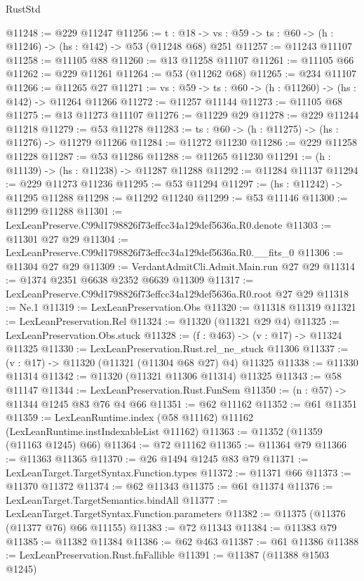 \begin{lexlean}{RustStd}
\begin{coremodule}
@11248 := @229 @11247
@11256 := {t : @18} ->
  {vs : @59} -> {ts : @60} -> (h : @11246) -> (hs : @142) -> @53 (@11248 @68) @251
@11257 := @11243 @11107
@11258 := @11105 @88
@11260 := @13 @11258 @11107
@11261 := @11105 @66
@11262 := @229 @11261
@11264 := @53 (@11262 @68)
@11265 := @234 @11107
@11266 := @11265 @27
@11271 := {vs : @59} -> {ts : @60} -> (h : @11260) -> (hs : @142) -> @11264 @11266
@11272 := @11257 @11144
@11273 := @11105 @68
@11275 := @13 @11273 @11107
@11276 := @11229 @29
@11278 := @229 @11244 @11218
@11279 := @53 @11278
@11283 := {ts : @60} -> (h : @11275) -> (hs : @11276) -> @11279 @11266
@11284 := @11272 @11230
@11286 := @229 @11258 @11228
@11287 := @53 @11286
@11288 := @11265 @11230
@11291 := (h : @11139) -> (hs : @11238) -> @11287 @11288
@11292 := @11284 @11137
@11294 := @229 @11273 @11236
@11295 := @53 @11294
@11297 := (hs : @11242) -> @11295 @11288
@11298 := @11292 @11240
@11299 := @53 @11146
@11300 := @11299 @11288
@11301 := LexLeanPreserve.C99d1798826f73effcc34a129def5636a.R0.denote
@11303 := @11301 @27 @29
@11304 := LexLeanPreserve.C99d1798826f73effcc34a129def5636a.R0.__fits_0
@11306 := @11304 @27 @29
@11309 := VerdantAdmitCli.Admit.Main.run @27 @29
@11314 := @1374 @2351 @6638 @2352 @6639 @11309
@11317 := LexLeanPreserve.C99d1798826f73effcc34a129def5636a.R0.root @27 @29
@11318 := Ne.{1}
@11319 := LexLeanPreservation.Obs
@11320 := @11318 @11319
@11321 := LexLeanPreservation.Rel
@11324 := @11320 (@11321 @29 @4)
@11325 := LexLeanPreservation.Obs.stuck
@11328 := (f : @463) -> (v : @17) -> @11324 @11325
@11330 := LexLeanPreservation.Rust.rel_ne_stuck @11306
@11337 := (v : @17) -> @11320 (@11321 (@11304 @68 @27) @4) @11325
@11338 := @11330 @11314
@11342 := @11320 (@11321 @11306 @11314) @11325
@11343 := @58 @11147
@11344 := LexLeanPreservation.Rust.FunSem
@11350 := (n : @57) -> @11344 @1245 @83 @76 @4 @66
@11351 := @62 @11162
@11352 := @61 @11351
@11359 := LexLeanRuntime.index (@58 @11162) @11162 (LexLeanRuntime.instIndexableList @11162)
@11363 := @11352 (@11359 (@11163 @1245) @66)
@11364 := @72 @11162
@11365 := @11364 @79
@11366 := @11363 @11365
@11370 := @26 @1494 @1245 @83 @79
@11371 := LexLeanTarget.TargetSyntax.Function.types
@11372 := @11371 @66
@11373 := @11370 @11372
@11374 := @62 @11343
@11375 := @61 @11374
@11376 := LexLeanTarget.TargetSemantics.bindAll
@11377 := LexLeanTarget.TargetSyntax.Function.parameters
@11382 := @11375 (@11376 (@11377 @76) @66 @11155)
@11383 := @72 @11343
@11384 := @11383 @79
@11385 := @11382 @11384
@11386 := @62 @463
@11387 := @61 @11386
@11388 := LexLeanPreservation.Rust.fnFallible
@11391 := @11387 (@11388 @1503 @1245)

\end{coremodule}
\end{lexlean}
